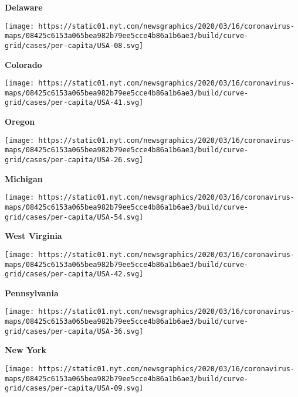 \textbf{Delaware}

\href{https://www.nytimes.com/interactive/2020/us/colorado-coronavirus-cases.html}{}

\texttt{[image: https://static01.nyt.com/newsgraphics/2020/03/16/coronavirus-maps/08425c6153a065bea982b79ee5cce4b86a1b6ae3/build/curve-grid/cases/per-capita/USA-08.svg]}

\textbf{Colorado}

\href{https://www.nytimes.com/interactive/2020/us/oregon-coronavirus-cases.html}{}

\texttt{[image: https://static01.nyt.com/newsgraphics/2020/03/16/coronavirus-maps/08425c6153a065bea982b79ee5cce4b86a1b6ae3/build/curve-grid/cases/per-capita/USA-41.svg]}

\textbf{Oregon}

\href{https://www.nytimes.com/interactive/2020/us/michigan-coronavirus-cases.html}{}

\texttt{[image: https://static01.nyt.com/newsgraphics/2020/03/16/coronavirus-maps/08425c6153a065bea982b79ee5cce4b86a1b6ae3/build/curve-grid/cases/per-capita/USA-26.svg]}

\textbf{Michigan}

\href{https://www.nytimes.com/interactive/2020/us/west-virginia-coronavirus-cases.html}{}

\texttt{[image: https://static01.nyt.com/newsgraphics/2020/03/16/coronavirus-maps/08425c6153a065bea982b79ee5cce4b86a1b6ae3/build/curve-grid/cases/per-capita/USA-54.svg]}

\textbf{West Virginia}

\href{https://www.nytimes.com/interactive/2020/us/pennsylvania-coronavirus-cases.html}{}

\texttt{[image: https://static01.nyt.com/newsgraphics/2020/03/16/coronavirus-maps/08425c6153a065bea982b79ee5cce4b86a1b6ae3/build/curve-grid/cases/per-capita/USA-42.svg]}

\textbf{Pennsylvania}

\href{https://www.nytimes.com/interactive/2020/us/new-york-coronavirus-cases.html}{}

\texttt{[image: https://static01.nyt.com/newsgraphics/2020/03/16/coronavirus-maps/08425c6153a065bea982b79ee5cce4b86a1b6ae3/build/curve-grid/cases/per-capita/USA-36.svg]}

\textbf{New York}

\href{https://www.nytimes.com/interactive/2020/us/connecticut-coronavirus-cases.html}{}

\texttt{[image: https://static01.nyt.com/newsgraphics/2020/03/16/coronavirus-maps/08425c6153a065bea982b79ee5cce4b86a1b6ae3/build/curve-grid/cases/per-capita/USA-09.svg]}

